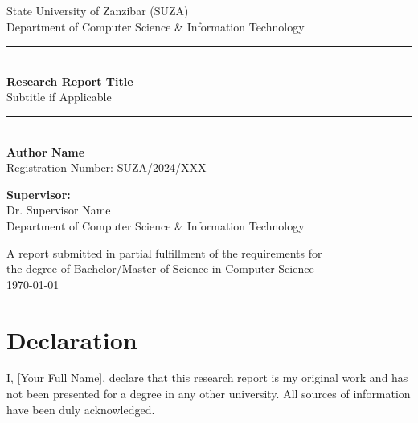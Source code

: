 \documentclass[12pt, a4paper]{report}
\newcommand{\suza}{State University of Zanzibar (SUZA)}
\newcommand{\dept}{Department of Computer Science \& Information Technology}
\begin{document}
	
	\begin{titlepage}
		\centering
		\vspace*{1cm}
		
		
		{\Large \suza{}}\\[0.5cm]
		{\Large \dept{}}\\[2cm]
		
		\rule{\textwidth}{1.5pt}\\[0.5cm]
		{\huge\bfseries Research Report Title}\\[0.5cm]
		{\large Subtitle if Applicable}\\[0.2cm]
		\rule{\textwidth}{1.5pt}\\[2cm]
		
		{\Large
			\textbf{Author Name}\\[0.3cm]
			Registration Number: SUZA/2024/XXX\\[2cm]
		}
		
		{\large
			\textbf{Supervisor:}\\
			Dr. Supervisor Name\\
			\dept{}\\[2cm]
		}
		
		\vfill
		
		{\large A report submitted in partial fulfillment of the requirements for\\
			the degree of Bachelor/Master of Science in Computer Science}\\[1cm]
		
		{\large \today}
		
	\end{titlepage}
	
	\chapter*{Declaration}
	
	I, [Your Full Name], declare that this research report is my original work and has not been presented for a degree in any other university. All sources of information have been duly acknowledged.
	
\end{document}
